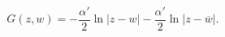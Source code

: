 \begin{equation}
G(z,w)=-\frac{\alpha '}{2}\ln |z-w|-\frac{\alpha '}{2}\ln |z-\overline{w}|.
\end{equation}

